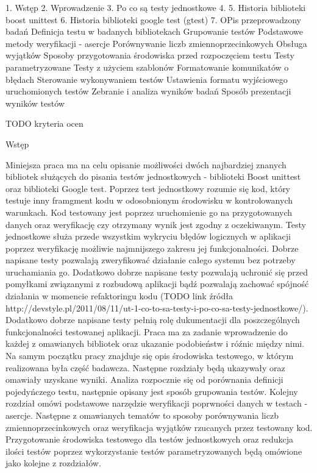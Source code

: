 1. Wstęp
2. Wprowadzenie
3. Po co są testy jednostkowe
4. 
5. Historia biblioteki boost unittest
6. Historia biblioteki google test (gtest)
7. OPis przeprowadzony badań
Definicja testu w badanych bibliotekach
Grupowanie testów
Podstawowe metody weryfikacji - asercje
Porównywanie liczb zmiennoprzecinkowych
Obsługa wyjątków
Sposoby przygotowania środowiska przed rozpoczęciem testu
Testy parametryzowane
Testy z użyciem szablonów
Formatowanie komunikatów o błędach
Sterowanie wykonywaniem testów
Ustawienia formatu wyjściowego uruchomionych testów
Zebranie i analiza wyników badań
Sposób prezentacji wyników testów

TODO kryteria ocen


Wstęp

Miniejsza praca ma na celu opisanie możliwości dwóch najbardziej znanych bibliotek służących do pisania testów jednostkowych - biblioteki Boost unittest oraz biblioteki Google test.
Poprzez test jednostkowy rozumie się kod, który testuje inny framgment kodu w odosobnionym środowisku w kontrolowanych warunkach. Kod testowany jest poprzez uruchomienie go na przygotowanych danych oraz weryfikację czy otrzymany wynik jest zgodny z oczekiwanym.
Testy jednostkowe służa przede wszystkim wykryciu błędów logicznych w aplikacji poprzez weryfikację możliwie najmnijszego zakresu jej funkcjonalności. Dobrze napisane testy pozwalają zweryfikować działanie całego systemu bez potrzeby uruchamiania go. Dodatkowo dobrze napisane testy pozwalają uchronić się przed pomyłkami związanymi z rozbudową aplikacji bądź pozwalają zachować spójność działania w momencie refaktoringu kodu (TODO link źródła http://devstyle.pl/2011/08/11/ut-1-co-to-sa-testy-i-po-co-sa-testy-jednostkowe/).
Dodatkowo dobrze napisane testy pełnią rolę dukumentacji dla poszczególnych funkcjonalności testowanej aplikacji.
Praca ma za zadanie wprowadzenie do każdej z omawianych bibliotek oraz ukazanie podobieństw i róźnic między nimi.
Na samym początku pracy znajduje się opis środowiska testowego, w którym realizowana była część badawcza. Następne rozdziały będą ukazywały oraz omawiały uzyskane wyniki.
Analiza rozpocznie się od porównania definicji pojedyńczego testu, następnie opisany jest sposób grupowania testów. Kolejny rozdział omówi podstawowe narzędzie weryfikacji poprwności danych w testach - asercje.
Następne z omawianych tematów to sposoby porównywania liczb zmiennoprzecinkowych oraz weryfikacja wyjątków rzucanych przez testowany kod. Przygotowanie środowiska testowego dla testów jednostkowych oraz redukcja ilości testów poprzez wykorzystanie testów parametryzowanych będą omówione jako kolejne z rozdziałów.
